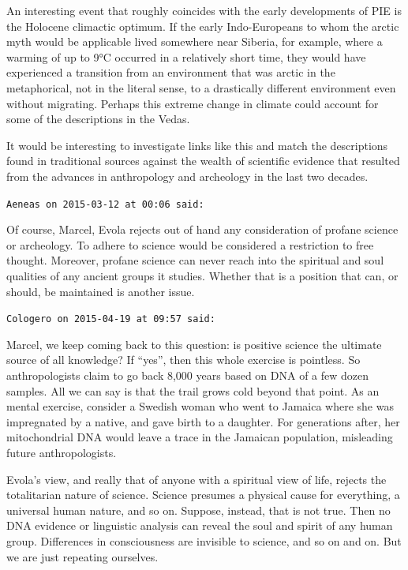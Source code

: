 \begin{footnotesize}
\begin{sffamily}
An interesting event that roughly coincides with the early developments of PIE is the Holocene climactic optimum. If the early Indo-Europeans to whom the arctic myth would be applicable lived somewhere near Siberia, for example, where a warming of up to 9°C occurred in a relatively short time, they would have experienced a transition from an environment that was arctic in the metaphorical, not in the literal sense, to a drastically different environment even without migrating. Perhaps this extreme change in climate could account for some of the descriptions in the Vedas.

It would be interesting to investigate links like this and match the descriptions found in traditional sources against the wealth of scientific evidence that resulted from the advances in anthropology and archeology in the last two decades.

\hfill

\texttt{Aeneas on 2015-03-12 at 00:06 said:}

Of course, Marcel, Evola rejects out of hand any consideration of profane science or archeology. To adhere to science would be considered a restriction to free thought. Moreover, profane science can never reach into the spiritual and soul qualities of any ancient groups it studies. Whether that is a position that can, or should, be maintained is another issue.

\hfill

\texttt{Cologero on 2015-04-19 at 09:57 said:}

Marcel, we keep coming back to this question: is positive science the ultimate source of all knowledge? If ``yes'', then this whole exercise is pointless. So anthropologists claim to go back 8,000 years based on DNA of a few dozen samples. All we can say is that the trail grows cold beyond that point. As an mental exercise, consider a Swedish woman who went to Jamaica where she was impregnated by a native, and gave birth to a daughter. For generations after, her mitochondrial DNA would leave a trace in the Jamaican population, misleading future anthropologists.

Evola's view, and really that of anyone with a spiritual view of life, rejects the totalitarian nature of science. Science presumes a physical cause for everything, a universal human nature, and so on. Suppose, instead, that is not true. Then no DNA evidence or linguistic analysis can reveal the soul and spirit of any human group. Differences in consciousness are invisible to science, and so on and on. But we are just repeating ourselves.


\end{sffamily}
\end{footnotesize}
